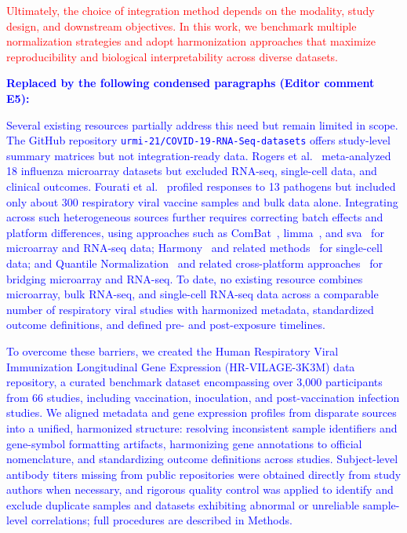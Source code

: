 \documentclass[
  12pt]{article}
\newcommand{\delmark}[1]{\textcolor{red}{#1}}
\newcommand{\addmark}[1]{\textcolor{blue}{#1}}
\begin{document}
\medskip
\delmark{Ultimately, the choice of integration method depends on the modality, study design, and downstream objectives. In this work, we benchmark multiple normalization strategies and adopt harmonization approaches that maximize reproducibility and biological interpretability across diverse datasets.}

\bigskip
\noindent\textbf{\textcolor{blue}{Replaced by the following condensed paragraphs (Editor comment E5):}}

\medskip
\addmark{Several existing resources partially address this need but remain limited in scope. The GitHub repository \texttt{urmi-21/COVID-19-RNA-Seq-datasets} offers study-level summary matrices but not integration-ready data. Rogers et al.~\citep{rogers2019} meta-analyzed 18 influenza microarray datasets but excluded RNA-seq, single-cell data, and clinical outcomes. Fourati et al.~\citep{fourati2022} profiled responses to 13 pathogens but included only about 300 respiratory viral vaccine samples and bulk data alone. Integrating across such heterogeneous sources further requires correcting batch effects and platform differences, using approaches such as ComBat~\citep{wang2017combat}, limma~\citep{ritchie2015limma}, and sva~\citep{leek2012sva} for microarray and RNA-seq data; Harmony~\citep{korsunsky2019harmony} and related methods~\citep{stuart2019comprehensive,haghverdi2018mnn} for single-cell data; and Quantile Normalization~\citep{bolstad2003} and related cross-platform approaches~\citep{thompson2015,tang2021rankin,Sun2026CrossPlatform} for bridging microarray and RNA-seq. To date, no existing resource combines microarray, bulk RNA-seq, and single-cell RNA-seq data across a comparable number of respiratory viral studies with harmonized metadata, standardized outcome definitions, and defined pre- and post-exposure timelines.}

\medskip
\addmark{To overcome these barriers, we created the Human Respiratory Viral Immunization Longitudinal Gene Expression (HR-VILAGE-3K3M) data repository, a curated benchmark dataset encompassing over 3,000 participants from 66 studies, including vaccination, inoculation, and post-vaccination infection studies. We aligned metadata and gene expression profiles from disparate sources into a unified, harmonized structure: resolving inconsistent sample identifiers and gene-symbol formatting artifacts, harmonizing gene annotations to official nomenclature, and standardizing outcome definitions across studies. Subject-level antibody titers missing from public repositories were obtained directly from study authors when necessary, and rigorous quality control was applied to identify and exclude duplicate samples and datasets exhibiting abnormal or unreliable sample-level correlations; full procedures are described in Methods.}
\end{document}
